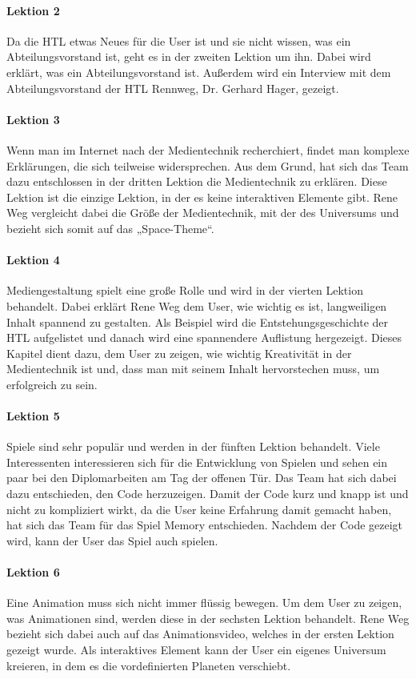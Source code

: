\paragraph{Lektion 2}
Da die HTL etwas Neues für die User ist und sie nicht wissen, was ein Abteilungsvorstand ist, geht es in der zweiten Lektion um ihn. Dabei wird erklärt, was ein Abteilungsvorstand ist. Außerdem wird ein Interview mit dem Abteilungsvorstand der HTL Rennweg, Dr. Gerhard Hager, gezeigt. 

\paragraph{Lektion 3}
Wenn man im Internet nach der Medientechnik recherchiert, findet man komplexe Erklärungen, die sich teilweise widersprechen. Aus dem Grund, hat sich das Team dazu entschlossen in der dritten Lektion die Medientechnik zu erklären. Diese Lektion ist die einzige Lektion, in der es keine interaktiven Elemente gibt. Rene Weg vergleicht dabei die Größe der Medientechnik, mit der des Universums und bezieht sich somit auf das „Space-Theme“. 

\paragraph{Lektion 4}
Mediengestaltung spielt eine große Rolle und wird in der vierten Lektion behandelt. Dabei erklärt Rene Weg dem User, wie wichtig es ist, langweiligen Inhalt spannend zu gestalten. Als Beispiel wird die Entstehungsgeschichte der HTL aufgelistet und danach wird eine spannendere Auflistung hergezeigt. Dieses Kapitel dient dazu, dem User zu zeigen, wie wichtig Kreativität in der Medientechnik ist und, dass man mit seinem Inhalt hervorstechen muss, um erfolgreich zu sein.

\paragraph{Lektion 5}
Spiele sind sehr populär und werden in der fünften Lektion behandelt. Viele Interessenten interessieren sich für die Entwicklung von Spielen und sehen ein paar bei den Diplomarbeiten am Tag der offenen Tür. Das Team hat sich dabei dazu entschieden, den Code herzuzeigen. Damit der Code kurz und knapp ist und nicht zu kompliziert wirkt, da die User keine Erfahrung damit gemacht haben, hat sich das Team für das Spiel Memory entschieden. Nachdem der Code gezeigt wird, kann der User das Spiel auch spielen.

\paragraph{Lektion 6}
Eine Animation muss sich nicht immer flüssig bewegen. Um dem User zu zeigen, was Animationen sind, werden diese in der sechsten Lektion behandelt. Rene Weg bezieht sich dabei auch auf das Animationsvideo, welches in der ersten Lektion gezeigt wurde. Als interaktives Element kann der User ein eigenes Universum kreieren, in dem es die vordefinierten Planeten verschiebt. 

